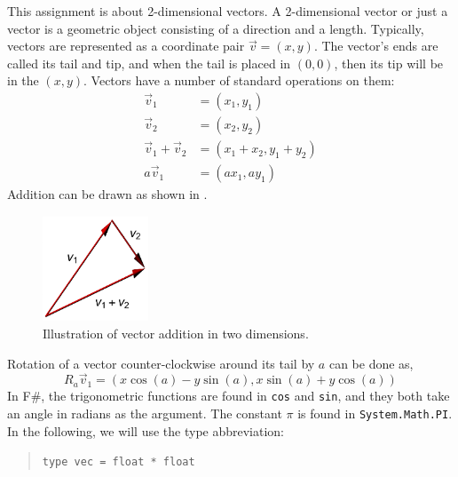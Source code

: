 This assignment is about 2-dimensional vectors. A 2-dimensional vector or just a vector is a geometric object consisting of a direction and a length. Typically, vectors are represented as a coordinate pair $\vec v  = (x, y)$. The vector's ends are called its tail and tip, and when the tail is placed in $(0, 0)$, then its tip will be in the  $(x, y)$. Vectors have a number of standard operations on them:
\begin{align}
  \vec v_1 &= (x_1, y_1)
  \\\vec v_2 &= (x_2, y_2)
  \\\vec v_1 + \vec v_2 &= (x_1+x_2, y_1+y_2) \label{eq:addition}
  \\a \vec v_1 &= (a x_1, a y_1)  \label{eq:scalarMul}
\end{align}
Addition can be drawn as shown in .
\begin{figure}
  \centering
  \includegraphics[width=0.28\textwidth]{vectorAddition}
  \caption{Illustration of vector addition in two dimensions.}
  \label{fig:vectorAddition}
\end{figure}
Rotation of a vector counter-clockwise around its tail by $a$ can be done as,
\begin{equation}
  R_a \vec v_1 = (x\cos(a) - y\sin(a),x\sin(a)+y\cos(a)) \label{eq:rotation}
\end{equation}
In F\#, the trigonometric functions are found in \lstinline{cos} and \lstinline{sin}, and they both take an angle in radians as the argument. The constant $\pi$ is found in \lstinline{System.Math.PI}. In the following, we will use the type abbreviation:
\begin{quote}
  \mbox{\lstinline!type vec = float * float!}
\end{quote}
